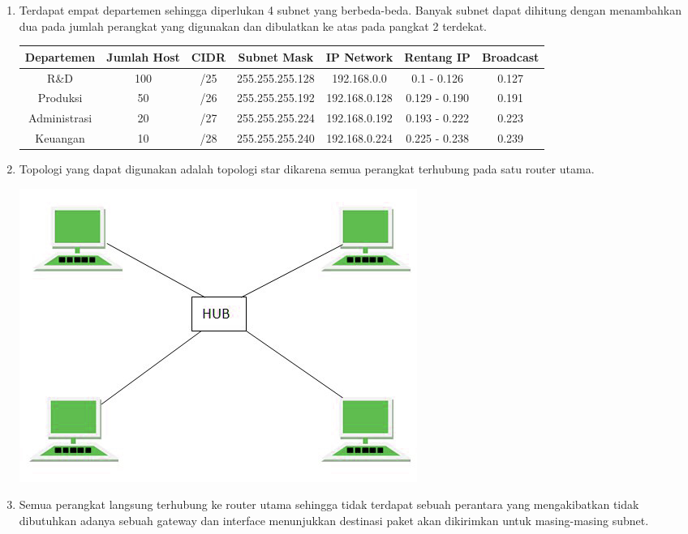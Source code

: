 \begin{enumerate}
	\item Terdapat empat departemen sehingga diperlukan 4 subnet yang berbeda-beda. Banyak subnet dapat dihitung dengan menambahkan dua pada jumlah perangkat yang digunakan dan dibulatkan ke atas pada pangkat 2 terdekat.
	{\small
		\begin{center}
		\begin{tabular}{ |c|c|c|c|c|c|c| } 
			\hline
			Departemen & Jumlah Host & CIDR & Subnet Mask & IP Network & Rentang IP & Broadcast \\
			\hline
			R\&D & 100 & /25 & 255.255.255.128 & 192.168.0.0 & 0.1 - 0.126 & 0.127 \\
			Produksi & 50 & /26 & 255.255.255.192 & 192.168.0.128 & 0.129 - 0.190 & 0.191 \\
			Administrasi & 20 & /27 & 255.255.255.224 & 192.168.0.192 & 0.193 - 0.222 & 0.223 \\
			Keuangan & 10 & /28 & 255.255.255.240 & 192.168.0.224 & 0.225 - 0.238 & 0.239 \\
			\hline
		\end{tabular}
		\end{center}
	}
	\item Topologi yang dapat digunakan adalah topologi star dikarena semua perangkat terhubung pada satu router utama.
	\begin{center}
		\includegraphics[scale=0.5]{P1/img/Tupen2.jpg}
    \end{center}
	\item Semua perangkat langsung terhubung ke router utama sehingga tidak terdapat sebuah perantara yang mengakibatkan tidak dibutuhkan adanya sebuah gateway dan interface menunjukkan destinasi paket akan dikirimkan untuk masing-masing subnet.

\end{enumerate}
